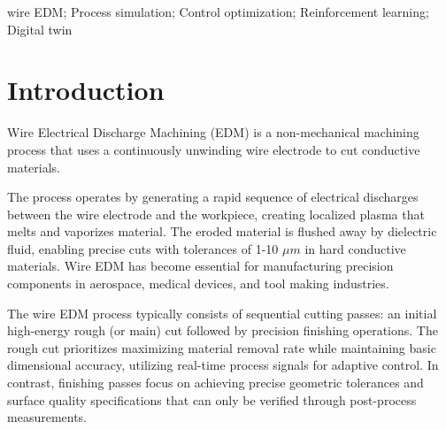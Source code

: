 \documentclass[5p,times,procedia]{elsarticle}
\begin{document}
\begin{frontmatter}
\begin{keyword}
wire EDM; Process simulation; Control optimization; Reinforcement learning; Digital twin




\end{keyword}

\end{frontmatter}



\section{Introduction}

\label{Intro}



Wire Electrical Discharge Machining (EDM) is a non-mechanical machining process that uses a continuously unwinding wire electrode to cut conductive materials.

The process operates by generating a rapid sequence of electrical discharges between the wire electrode and the workpiece, creating localized plasma that melts and vaporizes material. The eroded material is flushed away by dielectric fluid, enabling precise cuts with tolerances of 1-10 $\mu m$ in hard conductive materials. Wire EDM has become essential for manufacturing precision components in aerospace, medical devices, and tool making industries.

The wire EDM process typically consists of sequential cutting passes: an initial high-energy rough (or main) cut followed by precision finishing operations. The rough cut prioritizes maximizing material removal rate while maintaining basic dimensional accuracy, utilizing real-time process signals for adaptive control. In contrast, finishing passes focus on achieving precise geometric tolerances and surface quality specifications that can only be verified through post-process measurements.
\end{document}
